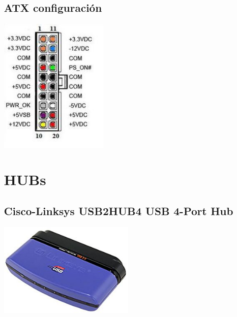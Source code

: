 \documentclass[user_manual.tex]{subfiles}
\begin{document}
\subsection{ATX configuración}
\begin{center}
\includegraphics[width=0.4\textwidth]{Figures/Hardware/Partes/ATX.JPG}
\label{fig:Hardware:Partes:Microfono:ATX}
\end{center}

\section{HUBs}

\subsection{Cisco-Linksys USB2HUB4 USB 4-Port Hub}

\begin{center}
\includegraphics[width=0.5\textwidth]{Figures/Hardware/Partes/Cisco-Linksys.png}
\label{fig:Hardware:Partes:Cisco}
\end{center}
\end{document}
